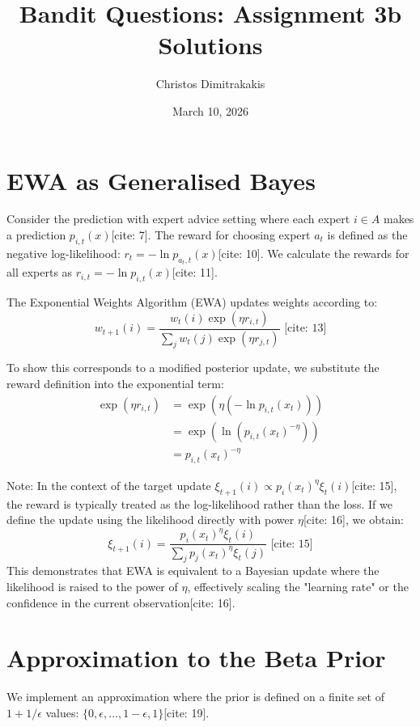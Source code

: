 \documentclass[11pt]{article}
\title{Bandit Questions: Assignment 3b Solutions}
\author{Christos Dimitrakakis}
\date{March 10, 2026}
\begin{document}
\maketitle

\section{EWA as Generalised Bayes}

Consider the prediction with expert advice setting where each expert $i \in A$ makes a prediction $p_{i,t}(x)$[cite: 7]. The reward for choosing expert $a_t$ is defined as the negative log-likelihood: $r_{t} = -\ln p_{a_t,t}(x)$[cite: 10]. We calculate the rewards for all experts as $r_{i,t} = -\ln p_{i,t}(x)$[cite: 11].

The Exponential Weights Algorithm (EWA) updates weights according to:
\begin{equation}
    w_{t+1}(i) = \frac{w_t(i) \exp(\eta r_{i,t})}{\sum_{j} w_t(j) \exp(\eta r_{j,t})} \text{ [cite: 13]}
\end{equation}

To show this corresponds to a modified posterior update, we substitute the reward definition into the exponential term:
\begin{align*}
    \exp(\eta r_{i,t}) &= \exp(\eta (-\ln p_{i,t}(x_t))) \\
    &= \exp(\ln (p_{i,t}(x_t)^{-\eta})) \\
    &= p_{i,t}(x_t)^{-\eta}
\end{align*}

Note: In the context of the target update $\xi_{t+1}(i) \propto p_i(x_t)^\eta \xi_t(i)$[cite: 15], the reward is typically treated as the log-likelihood rather than the loss. If we define the update using the likelihood directly with power $\eta$[cite: 16], we obtain:
\begin{equation}
    \xi_{t+1}(i) = \frac{p_i(x_t)^\eta \xi_t(i)}{\sum_j p_j(x_t)^\eta \xi_t(j)} \text{ [cite: 15]}
\end{equation}
This demonstrates that EWA is equivalent to a Bayesian update where the likelihood is raised to the power of $\eta$, effectively scaling the "learning rate" or the confidence in the current observation[cite: 16].

\section{Approximation to the Beta Prior}

We implement an approximation where the prior is defined on a finite set of $1 + 1/\epsilon$ values: $\{0, \epsilon, \dots, 1-\epsilon, 1\}$[cite: 19]. 
\end{document}
